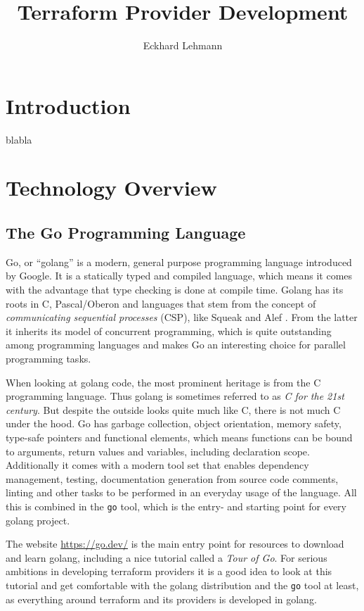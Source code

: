 \documentclass[paper=a4,11pt,numbers=noenddot]{article}
\title{Terraform Provider Development}
\author{Eckhard Lehmann}
\begin{document}
\maketitle
\tableofcontents

\section{Introduction}

blabla

\section{Technology Overview}
\label{sec:technology-overview}


\subsection{The Go Programming Language}
\label{subsec:go-progr-lang}

Go, or ``golang'' is a modern, general purpose programming language introduced by Google. It is a statically typed and compiled language, which means it comes with the advantage that type checking is done at compile time. Golang has its roots in C, Pascal/Oberon and languages that stem from the concept of \emph{communicating sequential processes} (CSP), like Squeak and Alef \cite{donovan_go_2016}. From the latter it inherits its model of concurrent programming, which is quite outstanding among programming languages and makes Go an interesting choice for parallel programming tasks.

When looking at golang code, the most prominent heritage is from the C programming language. Thus golang is sometimes referred to as \emph{C for the 21st century}. But despite the outside looks quite much like C, there is not much C under the hood. Go has garbage collection, object orientation, memory safety, type-safe pointers and functional elements, which means functions can be bound to arguments, return values and variables, including declaration scope. Additionally it comes with a modern tool set that enables dependency management, testing, documentation generation from source code comments, linting and other tasks to be performed in an everyday usage of the language. All this is combined in the \verb'go' tool, which is the entry- and starting point for every golang project.

The website \url{https://go.dev/} is the main entry point for resources to download and learn golang, including a nice tutorial called a \emph{Tour of Go}. For serious ambitions in developing terraform providers it is a good idea to look at this tutorial and get comfortable with the golang distribution and the \verb'go' tool at least, as everything around terraform and its providers is developed in golang.
\end{document}
